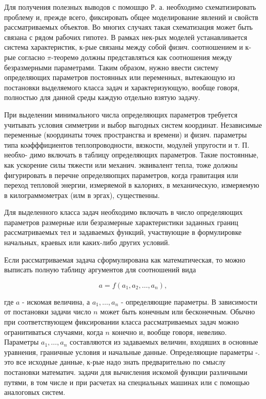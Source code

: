 \documentclass[10pt]{article}
\begin{document}
Для получения полезных выводов с помошцю Р. а. необходимо схематизировать проблему и, прежде всего, фиксировать общее моделирование явлений и свойств рассматриваемых объектов. Во многих случаях такая схематизация может быть связана с рядом рабочих гипотез. В рамках нек-рых моделей устанавливается система характеристик, к-рые связаны между собой физич. соотношением и к-рые согласно $\pi$-теоремө должны представляться как соотношения между безразмерными параметрами. Таким образом, нужно ввести систему определяющих параметров постоянных или переменных, вытекающую из постановки выделяемого класса задач и характеризующую, вообще говоря, полностью для данной среды каждую отдельно взятую задачу.



При выделении минимального числа определяющих параметров требуется учитывать условия симметрии и выбор выгодных систем координат. Независимые переменные (координаты точек пространсгва и времени) и физич. параметры типа коәфффициентов теплопроводности, вязкости, модулей упругости и т. П. необхо- димо включать в таблицу определяющих параметров. Такие постоянные, как ускорение силы тяжести или механич. эквивалент тепла, тоже должны фигурировать в перечне определяюпцих параметров, когда гравитация или переход тепловой энергии, измеряемой в калориях, в механическую, измеряемую в килограммометрах (илм в эргах), существенны.



Для выделенного класса задач необходимо включать в число определяющих параметров размерные или безразмерные характеристики заданных границ рассматриваемых тел и задаваемых функций, участвующие в формулировке начальных, краевых или каких-либо других условий.



Если рассматриваемая задача сформулирована как математическая, то можно выписать полную таблицу аргументов для соотношений вида



\[

a=f\left(a_{1}, a_{2}, \ldots, a_{n}\right),

\]



где $a$ - искомая величина, а $a_{1}, \ldots, a_{n}$ - определяющие параметры. В зависимости от постановки задачи число $n$ может быть конечным или бесконечным. Обычно при соответствующем фиксировании класса рассматриваемых задач можно огранитиваться случаями, когда $n$ конечно и, вообще говоря, невелико. Параметры $a_{1}, \ldots, a_{n}$ составляются из задаваемых величин, входяших в основные уравнения, граничные условия и начальные данные. Определяющие параметры -. это все исходные данные, к-рые надо знать предварительно по смыслу постановки математич. задачи для вычисления искомой функции различными путями, в том числе и при расчетах на специальных машинах или с помощью аналоговых систем.
\end{document}
